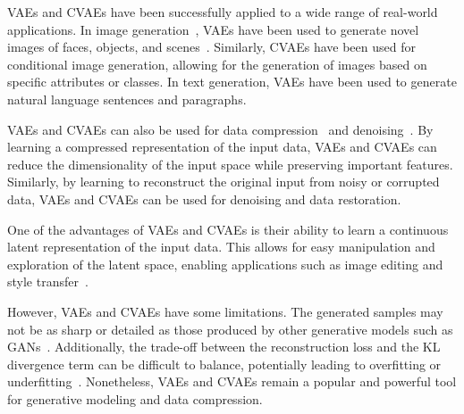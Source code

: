 
VAEs and CVAEs have been successfully applied to a wide range of real-world applications. In image generation~\cite{pml2Book}, VAEs have been used to generate novel images of faces, objects, and scenes~\cite{pml2Book}. Similarly, CVAEs have been used for conditional image generation, allowing for the generation of images based on specific attributes or classes. In text generation, VAEs have been used to generate natural language sentences and paragraphs.

VAEs and CVAEs can also be used for data compression~\cite{VAE_Compression} and denoising~\cite{VAE_denoising}. By learning a compressed representation of the input data, VAEs and CVAEs can reduce the dimensionality of the input space while preserving important features. Similarly, by learning to reconstruct the original input from noisy or corrupted data, VAEs and CVAEs can be used for denoising and data restoration.

One of the advantages of VAEs and CVAEs is their ability to learn a continuous latent representation of the input data. This allows for easy manipulation and exploration of the latent space, enabling applications such as image editing and style transfer~\cite{VAE}.

However, VAEs and CVAEs have some limitations. The generated samples may not be as sharp or detailed as those produced by other generative models such as GANs~\cite{VAEvsGAN}. Additionally, the trade-off between the reconstruction loss and the KL divergence term can be difficult to balance, potentially leading to overfitting or underfitting~\cite{KL_Loss_R_Loss}. Nonetheless, VAEs and CVAEs remain a popular and powerful tool for generative modeling and data compression.


% 


